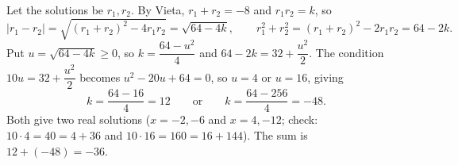 Let the solutions be $r_1,r_2$. By Vieta, $r_1+r_2=-8$ and $r_1r_2=k$, so
\[
|r_1-r_2|=\sqrt{(r_1+r_2)^2-4r_1r_2}=\sqrt{64-4k},\qquad r_1^2+r_2^2=(r_1+r_2)^2-2r_1r_2=64-2k .
\]
Put $u=\sqrt{64-4k}\ge0$, so $k=\dfrac{64-u^2}{4}$ and $64-2k=32+\dfrac{u^2}{2}$. The condition $10u=32+\dfrac{u^2}{2}$ becomes $u^2-20u+64=0$, so $u=4$ or $u=16$, giving
\[
k=\dfrac{64-16}{4}=12\qquad\text{or}\qquad k=\dfrac{64-256}{4}=-48 .
\]
Both give two real solutions ($x=-2,-6$ and $x=4,-12$; check: $10\cdot4=40=4+36$ and $10\cdot16=160=16+144$). The sum is $12+(-48)=\boxed{-36}$.
